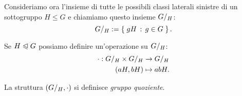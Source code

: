 Consideriamo ora l'insieme di tutte le possibili classi laterali sinistre di un sottogruppo $H \leq G$ e chiamiamo questo insieme ${G}/_{H}$: \begin{equation}
    {G}/_{H} := \left\{\;gH \,:\, g \in G\;\right\}.
\end{equation}

Se $H \trianglelefteqslant G$ possiamo definire un'operazione su ${G}/_{H}$: \begin{align} \label{eq:op_gruppo_quoziente}
    \begin{split}
        \cdot : {G}/_{H} \times {G}/_{H} &\to {G}/_{H} \\
        (aH, bH) &\mapsto abH.
    \end{split}
\end{align}

La struttura $({G}/_{H}, \cdot)$ si definisce \emph{gruppo quoziente}.


